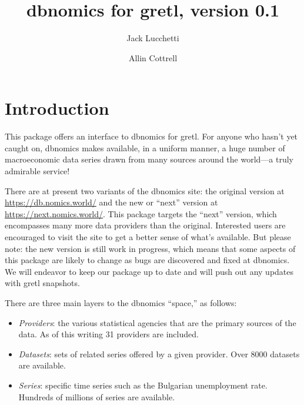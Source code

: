 \documentclass{article}
\begin{document}
\setlength{\parindent}{0pt}
\setlength{\parskip}{1ex}
\setcounter{secnumdepth}{1}

\newenvironment{funcdoc}[1]
{\noindent\hrulefill\newline\texttt{#1}\par\noindent\hrulefill\par\medskip\par}
{\bigskip}

\newcommand{\argname}[1]{\textsl{#1}}

\title{dbnomics for gretl, version 0.1}
\author{Jack Lucchetti \and Allin Cottrell}
\maketitle

\section{Introduction}

This package offers an interface to \textsf{dbnomics} for gretl. For
anyone who hasn't yet caught on, \textsf{dbnomics} makes available, in
a uniform manner, a huge number of macroeconomic data series drawn
from many sources around the world---a truly admirable service!

There are at present two variants of the \textsf{dbnomics} site: the
original version at \url{https://db.nomics.world/} and the new or
``next'' version at \url{https://next.nomics.world/}. This package
targets the ``next'' version, which encompasses many more data
providers than the original. Interested users are encouraged to visit
the site to get a better sense of what's available.  But please note:
the new version is still work in progress, which means that some
aspects of this package are likely to change as bugs are discovered
and fixed at \textsf{dbnomics}. We will endeavor to keep our package
up to date and will push out any updates with gretl snapshots.

There are three main layers to the \textsf{dbnomics} ``space,'' as
follows:
\begin{itemize}
\item \textit{Providers}: the various statistical agencies that are
  the primary sources of the data. As of this writing 31 providers
  are included.
\item \textit{Datasets}: sets of related series offered by a given
  provider. Over 8000 datasets are available.
\item \textit{Series}: specific time series such as the Bulgarian
  unemployment rate. Hundreds of millions of series are available.
\end{itemize}
\end{document}
